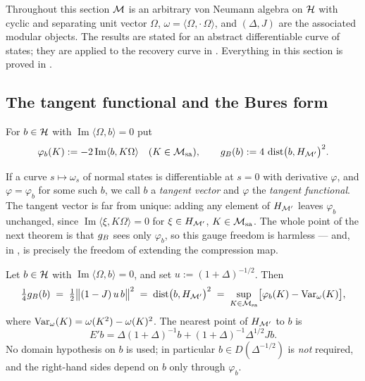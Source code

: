 Throughout this section $\mathcal M$ is an arbitrary von Neumann algebra on $\mathcal H$ with cyclic and separating unit
vector $\Omega$, $\omega=\langle\Omega,\cdot\,\Omega\rangle$, and $(\Delta,J)$ are the associated modular
objects.  The results are stated for an abstract differentiable curve of states; they are applied to the
recovery curve in .  Everything in this section is proved in \cite{RigorSV}.

\subsection{The tangent functional and the Bures form}

\begin{definition}\label{def:gB}
For $b\in\mathcal H$ with $\operatorname{Im}\langle\Omega,b\rangle=0$ put
\begin{equation}\label{eq:phib}
 \varphi_{b}(K):=-2\operatorname{Im}\langle b,K\Omega\rangle\quad(K\in\mathcal M_{\rm sa}),
 \qquad
 g_{B}(b):=4\,\operatorname{dist}\bigl(b,H_{\mathcal M'}\bigr)^{2}.
\end{equation}
\end{definition}

If a curve $s\mapsto\omega_{s}$ of normal states is differentiable at $s=0$ with derivative $\varphi$, and
$\varphi=\varphi_{b}$ for some such $b$, we call $b$ a \emph{tangent vector} and $\varphi$ the
\emph{tangent functional}.  The tangent vector is far from unique: adding any element of $H_{\mathcal M'}$ leaves
$\varphi_{b}$ unchanged, since $\operatorname{Im}\langle\xi,K\Omega\rangle=0$ for $\xi\in H_{\mathcal M'}$,
$K\in\mathcal M_{\rm sa}$.  The whole point of the next theorem is that $g_{B}$ sees only $\varphi_{b}$, so this
gauge freedom is harmless --- and, in , is precisely the freedom of extending the
compression map.

\begin{theorem}\label{thm:three}
Let $b\in\mathcal H$ with $\operatorname{Im}\langle\Omega,b\rangle=0$, and set $u:=(1+\Delta)^{-1/2}$.  Then
\begin{equation}\label{eq:three}
 \tfrac14g_{B}(b)\;=\;\tfrac12\bigl\|(1-J)\,u\,b\bigr\|^{2}
 \;=\;\operatorname{dist}\bigl(b,H_{\mathcal M'}\bigr)^{2}
 \;=\;\sup_{K\in\mathcal M_{\rm sa}}\bigl[\varphi_{b}(K)-\operatorname{Var}_{\omega}(K)\bigr],
\end{equation}
where $\operatorname{Var}_{\omega}(K)=\omega(K^{2})-\omega(K)^{2}$.  The nearest point of $H_{\mathcal M'}$ to $b$ is
\begin{equation}\label{eq:Eprime}
 E'b=\Delta(1+\Delta)^{-1}b+(1+\Delta)^{-1}\Delta^{1/2}Jb .
\end{equation}
No domain hypothesis on $b$ is used; in particular $b\in D(\Delta^{-1/2})$ is \emph{not} required, and the
right-hand sides depend on $b$ only through $\varphi_{b}$.
\end{theorem}

